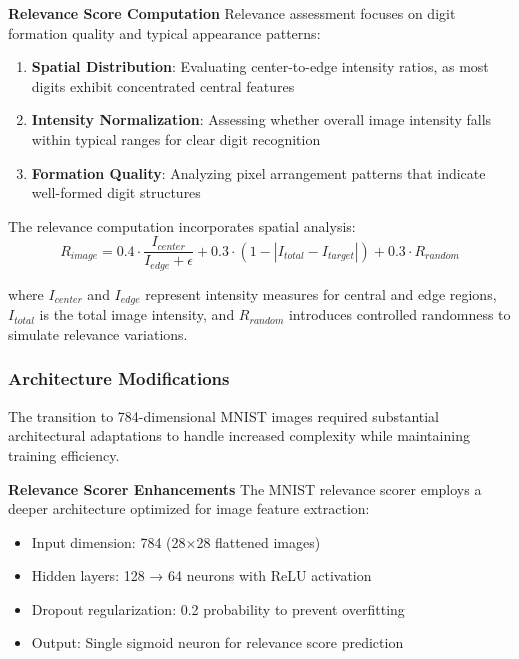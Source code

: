 \documentclass[12pt]{article}
\begin{document}
\textbf{Relevance Score Computation}
Relevance assessment focuses on digit formation quality and typical appearance patterns:

\begin{enumerate}
\item \textbf{Spatial Distribution}: Evaluating center-to-edge intensity ratios, as most digits exhibit concentrated central features
\item \textbf{Intensity Normalization}: Assessing whether overall image intensity falls within typical ranges for clear digit recognition
\item \textbf{Formation Quality}: Analyzing pixel arrangement patterns that indicate well-formed digit structures
\end{enumerate}

The relevance computation incorporates spatial analysis:
\begin{equation}
R_{image} = 0.4 \cdot \frac{I_{center}}{I_{edge} + \epsilon} + 0.3 \cdot (1 - |I_{total} - I_{target}|) + 0.3 \cdot R_{random}
\end{equation}

where $I_{center}$ and $I_{edge}$ represent intensity measures for central and edge regions, $I_{total}$ is the total image intensity, and $R_{random}$ introduces controlled randomness to simulate relevance variations.

\subsubsection{Architecture Modifications}\label{architecture-modifications}

The transition to 784-dimensional MNIST images required substantial architectural adaptations to handle increased complexity while maintaining training efficiency.

\textbf{Relevance Scorer Enhancements}
The MNIST relevance scorer employs a deeper architecture optimized for image feature extraction:

\begin{itemize}
\item Input dimension: 784 (28×28 flattened images)
\item Hidden layers: 128 → 64 neurons with ReLU activation
\item Dropout regularization: 0.2 probability to prevent overfitting
\item Output: Single sigmoid neuron for relevance score prediction
\end{itemize}
\end{document}
